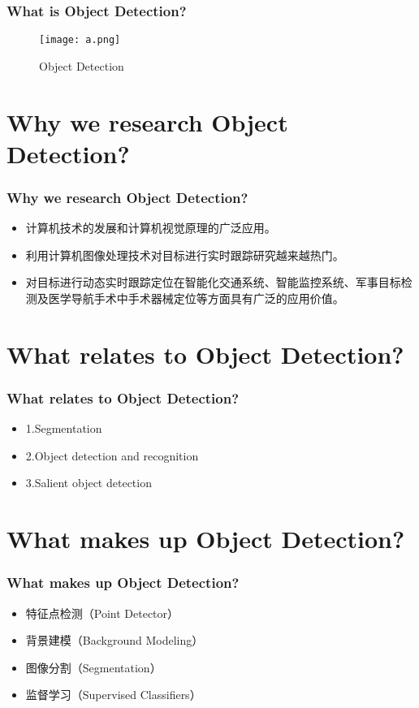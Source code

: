 \documentclass[notheorems,mathserif,table,compress]{beamer}  %
\begin{document}
\begin{frame}
  \frametitle{What is Object Detection?}  
  \begin{figure}[!ht]
  \centering\texttt{[image: a.png]}
  \caption{Object Detection}
  \end{figure}
\end{frame}%

\section{Why we research  Object Detection?}

\begin{frame}
  \frametitle{Why we research  Object Detection?}  
  \begin{itemize}
  \item 计算机技术的发展和计算机视觉原理的广泛应用。
  \item 利用计算机图像处理技术对目标进行实时跟踪研究越来越热门。
  \item 对目标进行动态实时跟踪定位在智能化交通系统、智能监控系统、军事目标检测及医学导航手术中手术器械定位等方面具有广泛的应用价值。
  \end{itemize}
\end{frame}%

\section{What relates to Object Detection?}

\begin{frame}
  \frametitle{What relates to Object Detection?}  
  \begin{itemize}
  \item 1.Segmentation
  \item 2.Object detection and recognition
  \item 3.Salient object detection
  \end{itemize}
\end{frame}%

\section{What makes up Object Detection?}

\begin{frame}
  \frametitle{What makes up Object Detection?}  
  \begin{itemize}
  \item 特征点检测（Point Detector）
  \item 背景建模（Background Modeling）
  \item 图像分割（Segmentation）
  \item 监督学习（Supervised Classifiers）
  \end{itemize}
\end{frame}%
\end{document}
